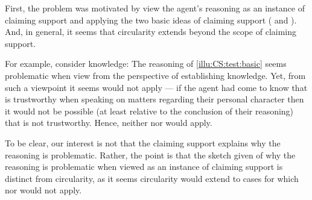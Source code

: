 \begin{note}
  First, the problem was motivated by view the agent's reasoning as an instance of claiming support and applying the two basic ideas of claiming support (\ideaCSA{} and \ideaCSB{}).
  And, in general, it seems that circularity extends beyond the scope of claiming support.

  For example, consider knowledge:
  The reasoning of \autoref{illu:CS:test:basic} seems problematic when view from the perspective of establishing knowledge.
  Yet, from such a viewpoint it seems \ideaCSA{} would not apply --- if the agent had come to know that  is trustworthy when speaking on matters regarding their personal character then it would not be possible (at least relative to the conclusion of their reasoning) that  is not trustworthy.
  Hence, neither \ideaCSA{} nor \ideaCSB{} would apply.

  To be clear, our interest is not that the claiming support explains why the reasoning is problematic.
  Rather, the point is that the sketch given of why the reasoning is problematic when viewed as an instance of claiming support is distinct from circularity, as it seems circularity would extend to cases for which \ideaCSA{} nor \ideaCSB{} would not apply.
\end{note}

